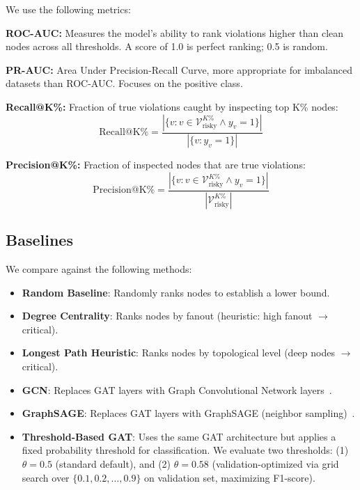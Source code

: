 \documentclass[10pt,twocolumn,journal]{IEEEtran}
\begin{document}
We use the following metrics:

\textbf{ROC-AUC:} Measures the model's ability to rank violations higher than clean nodes across all thresholds. A score of 1.0 is perfect ranking; 0.5 is random.

\textbf{PR-AUC:} Area Under Precision-Recall Curve, more appropriate for imbalanced datasets than ROC-AUC. Focuses on the positive class.

\textbf{Recall@K\%:} Fraction of true violations caught by inspecting top K\% nodes:
\begin{equation}
\text{Recall@K\%} = \frac{|\{v : v \in \mathcal{V}_{\text{risky}}^{K\%} \wedge y_v = 1\}|}{|\{v : y_v = 1\}|}
\label{eq:recall_k}
\end{equation}

\textbf{Precision@K\%:} Fraction of inspected nodes that are true violations:
\begin{equation}
\text{Precision@K\%} = \frac{|\{v : v \in \mathcal{V}_{\text{risky}}^{K\%} \wedge y_v = 1\}|}{|\mathcal{V}_{\text{risky}}^{K\%}|}
\label{eq:prec_k}
\end{equation}

\subsection{Baselines}

We compare against the following methods:
\begin{itemize}
    \item \textbf{Random Baseline}: Randomly ranks nodes to establish a lower bound.
    \item \textbf{Degree Centrality}: Ranks nodes by fanout (heuristic: high fanout $\rightarrow$ critical).
    \item \textbf{Longest Path Heuristic}: Ranks nodes by topological level (deep nodes $\rightarrow$ critical).
    \item \textbf{GCN}: Replaces GAT layers with Graph Convolutional Network layers~\cite{kipf2017gcn}.
    \item \textbf{GraphSAGE}: Replaces GAT layers with GraphSAGE (neighbor sampling)~\cite{hamilton2017graphsage}.
    \item \textbf{Threshold-Based GAT}: Uses the same GAT architecture but applies a fixed probability threshold for classification. We evaluate two thresholds: (1) $\theta = 0.5$ (standard default), and (2) $\theta = 0.58$ (validation-optimized via grid search over $\{0.1, 0.2, \ldots, 0.9\}$ on validation set, maximizing F1-score).
\end{itemize}
\end{document}
